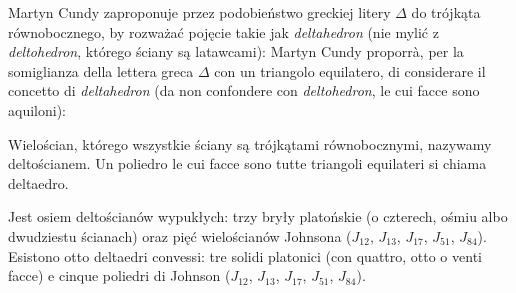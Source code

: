 %

Martyn Cundy zaproponuje przez podobieństwo greckiej litery $\Delta$ do trójkąta równobocznego, by rozważać pojęcie takie jak \emph{deltahedron} (nie mylić z \emph{deltohedron}, którego ściany są latawcami): %
Martyn Cundy proporrà, per la somiglianza della lettera greca $\Delta$ con un triangolo equilatero, di considerare il concetto di \emph{deltahedron} (da non confondere con \emph{deltohedron}, le cui facce sono aquiloni): %

\begin{definition}%
[deltościan] %
[deltaedro] %
    Wielościan, którego wszystkie ściany są trójkątami równobocznymi, nazywamy deltościanem. %
    Un poliedro le cui facce sono tutte triangoli equilateri si chiama deltaedro. %
\end{definition}

\begin{proposition}
    Jest osiem deltościanów wypukłych: trzy bryły platońskie (o czterech, ośmiu albo dwudziestu ścianach) oraz pięć wielościanów Johnsona ($J_{12}$, $J_{13}$, $J_{17}$, $J_{51}$, $J_{84}$). %
    Esistono otto deltaedri convessi: tre solidi platonici (con quattro, otto o venti facce) e cinque poliedri di Johnson ($J_{12}$, $J_{13}$, $J_{17}$, $J_{51}$, $J_{84}$). %
\end{proposition}


